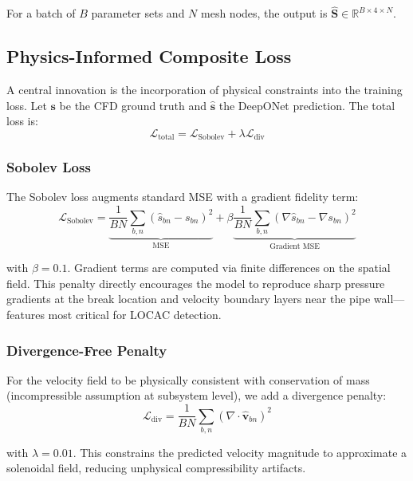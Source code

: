 \documentclass[conference]{IEEEtran}
\begin{document}
For a batch of $B$ parameter sets and $N$ mesh nodes, the output is $\hat{\mathbf{S}} \in \mathbb{R}^{B \times 4 \times N}$.

\subsection{Physics-Informed Composite Loss}

A central innovation is the incorporation of physical constraints into the training loss. Let $\mathbf{s}$ be the CFD ground truth and $\hat{\mathbf{s}}$ the DeepONet prediction. The total loss is:
\begin{equation}
\mathcal{L}_\text{total} = \mathcal{L}_\text{Sobolev} + \lambda \mathcal{L}_\text{div}
\label{eq:loss_total}
\end{equation}

\subsubsection{Sobolev Loss}
The Sobolev loss augments standard MSE with a gradient fidelity term:
\begin{equation}
\mathcal{L}_\text{Sobolev} = \underbrace{\frac{1}{BN}\sum_{b,n}(\hat{s}_{bn} - s_{bn})^2}_{\text{MSE}} + \beta \underbrace{\frac{1}{BN}\sum_{b,n}(\nabla\hat{s}_{bn} - \nabla s_{bn})^2}_{\text{Gradient MSE}}
\label{eq:sobolev}
\end{equation}

with $\beta = 0.1$. Gradient terms are computed via finite differences on the spatial field. This penalty directly encourages the model to reproduce sharp pressure gradients at the break location and velocity boundary layers near the pipe wall—features most critical for LOCAC detection.

\subsubsection{Divergence-Free Penalty}
For the velocity field to be physically consistent with conservation of mass (incompressible assumption at subsystem level), we add a divergence penalty:
\begin{equation}
\mathcal{L}_\text{div} = \frac{1}{BN}\sum_{b,n}\left(\nabla \cdot \hat{\mathbf{v}}_{bn}\right)^2
\label{eq:div}
\end{equation}

with $\lambda = 0.01$. This constrains the predicted velocity magnitude to approximate a solenoidal field, reducing unphysical compressibility artifacts.
\end{document}
